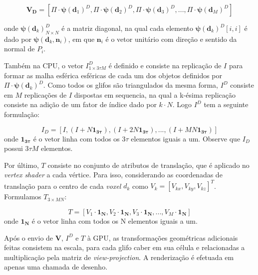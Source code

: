 \documentclass[
    12pt,                %
    oneside,            %
    a4paper,            %
    english,            %
    french,                %
    spanish,            %
    brazil                %
    ]{abntex2}
\begin{document}
\begin{equation}
\label{eq::vertices_prototipo1}
    \mathbf{V_D} = [
    \Pi\cdot\boldsymbol{\psi}(\mathbf{d}_1)^D,
    \Pi\cdot\boldsymbol{\psi}(\mathbf{d}_2)^D,
    \Pi\cdot\boldsymbol{\psi}(\mathbf{d}_3)^D, ...,
    \Pi\cdot\boldsymbol{\psi}(\mathbf{d}_M)^D
    ]
\end{equation}

onde $\boldsymbol{\psi}(\mathbf{d}_k)_{N\times N}^D$ é a matriz diagonal, na qual cada elemento $\boldsymbol{\psi}(\mathbf{d}_k)^D[i, i]$ é dado por $\boldsymbol{\psi}(\mathbf{d}_k, \mathbf{n}_i)$, em que $\mathbf{n}_i$ é o vetor unitário com direção e sentido da normal de $P_i$.

Também na CPU, o vetor $I_{1 \times 3 \tau M}^D$ é definido e consiste na replicação de $I$ para formar as malha esférica esféricas de cada um dos objetos definidos por $\Pi\cdot\boldsymbol{\psi}(\mathbf{d}_k)^D$. Como todos os glifos são triangulados da mesma forma, $I^D$ consiste em $M$ replicações de $I$ dispostas em sequencia, na qual a k-ésima replicação consiste na adição de um fator de índice dado por $k\cdot N$. Logo $I^D$ tem a seguinte formulação:

\begin{equation}
\label{eq::index_prototipo1}
    I_D = [
    I, 
    (I +  N\mathbf{1_{3\tau}}  ),
    (I + 2N\mathbf{1_{3\tau}} ), ..., 
    (I + MN\mathbf{1_{3\tau}})
    ]
\end{equation}
onde $\mathbf{1_{3\tau}}$ é o vetor linha com todos os $3\tau$ elementos iguais a um. Observe que $I_D$ possui $3\tau M$ elementos.

Por último, $T$ consiste no conjunto de atributos de translação, que é aplicado no \textit{vertex shader} a cada vértice. Para isso, considerando as coordenadas de translação para o centro de cada \textit{voxel} $d_k$ como $V_k = [V_{kx}, V_{ky}, V_{kz}]^T$. Formulamos $T_{3 \times MN}$:

\begin{equation}
\label{eq::translation_prototipo1}
    T = [
    V_1 \cdot \mathbf{1_N},
    V_2 \cdot \mathbf{1_N},
    V_3 \cdot \mathbf{1_N}, ...,
    V_M \cdot \mathbf{1_N}
    ]
\end{equation}
onde $\mathbf{1_N}$ é o vetor linha com todos os N elementos iguais a um.

Após o envio de $\mathbf{V}$, $I^D$ e $T$ à GPU, as transformações geométricas adicionais feitas consistem na escala, para cada glifo caber em sua célula e relacionadas a multiplicação pela matriz de \textit{view-projection}. A renderização é efetuada em apenas uma chamada de desenho.
\end{document}
